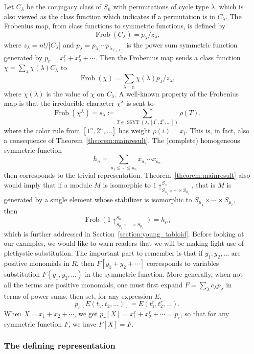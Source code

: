 \documentclass[a4paper,12pt]{amsart}
\theoremstyle{plain}
\theoremstyle{definition}
\theoremstyle{remark}
\DeclareMathOperator{\Frob}{Frob}
\DeclareMathOperator{\SSYT}{SSYT}
\begin{document}
Let $C_\lambda$ be the conjugacy class of $S_n$ with permutations of cycle type $\lambda$, which is also viewed as the class function which indicates if a permutation is in $C_\lambda$. The Frobenius map, from class functions to symmetric functions, is defined by
\[
\Frob(C_\lambda) = p_\lambda/z_\lambda,
\]
where $z_\lambda = n!/|C_\lambda|$ and $p_\lambda = p_{\lambda_1} \cdots p_{\lambda_{\ell(\lambda)}}$ is the power sum symmetric function generated
by $p_r = x_1^r + x_2^r+ \cdots$. 
Then the Frobenius map sends a class function $\chi = \sum_\lambda \chi(\lambda) C_\lambda$ to
\[
\Frob(\chi) = \sum_{\lambda \vdash n} \chi(\lambda) p_\lambda/z_\lambda,
\]
where $\chi(\lambda)$ is the value of $\chi$ on $C_\lambda$.
A well-known property of the Frobenius map is that the irreducible character $\chi^\lambda$ is sent to 
\[
\Frob(\chi^\lambda) = s_\lambda \coloneq \sum_{T \in \SSYT(\lambda, [1^n,2^n,\dots])} \rho(T),
\]
where the color rule from $[1^n,2^n,\dots]$ has weight $\rho(i) =x_i$. This is, in fact, also a consequence of Theorem~\ref{theorem:mainresult}.
The (complete) homogeneous symmetric function 
\[
h_n = \sum_{a_1 \leq \cdots \leq a_n} x_{a_1} \cdots x_{a_n}
\]
then corresponds to the trivial representation. Theorem~\ref{theorem:mainresult} also would imply that if a module $M$ is isomorphic to $1 \uparrow_{S_{\mu_1} \times \cdots \times S_{\mu_\ell}}^{S_n}$, that is $M$ is generated by a single element whose stabilizer is isomorphic to $S_{\mu_1}\times \cdots \times S_{\mu_\ell}$, then
\[
\Frob\left(1 \uparrow_{S_{\mu_1} \times \cdots \times S_{\mu_\ell}}^{S_n}\right)  = h_\mu,
\]
which is further addressed in Section~\ref{section:young_tabloid}.
Before looking at our examples, we would like to warn readers that we will be making light use of plethystic substitution. The important part to remember is that if $y_1,y_2,\dots$ are positive monomials in $R$, then $F[y_1+y_2+\cdots]$ corresponds to variables substitution $F(y_1,y_2,\dots)$ in the symmetric function. More generally, when not all the terms are positive monomials, one must first expand $F = \sum_\lambda c_\lambda p_\lambda$ in terms of power sums, then set, for any expression $E$,
\[
p_r[E(t_1,t_2,\dots)] = E(t_1^r,t_2^r,\dots).
\]
When $X= x_1+x_2+\cdots$, we get $p_r [X] = x_1^r+x_2^r+\cdots = p_r$, so that for any symmetric function $F$, we have $F[X] = F.$



\subsubsection{The defining representation}
\end{document}
